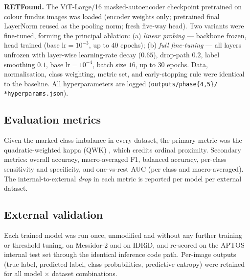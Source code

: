 \documentclass[journal]{IEEEtran}
\renewcommand{\_}{\origunderscore\allowbreak}
\begin{document}
\textbf{RETFound.} The ViT-Large/16 masked-autoencoder checkpoint pretrained on
colour fundus images \cite{zhou2023retfound} was loaded (encoder weights only;
pretrained final LayerNorm reused as the pooling norm; fresh five-way head). Two
variants were fine-tuned, forming the principal ablation: (a) \emph{linear
probing} --- backbone frozen, head trained (base $\text{lr}=10^{-3}$, up to $40$
epochs); (b) \emph{full fine-tuning} --- all layers unfrozen with layer-wise
learning-rate decay ($0.65$), drop-path $0.2$, label smoothing $0.1$, base
$\text{lr}=10^{-4}$, batch size $16$, up to $30$ epochs. Data, normalisation,
class weighting, metric set, and early-stopping rule were identical to the
baseline. All hyperparameters are logged
(\texttt{outputs/\allowbreak{}phase\{4,5\}\_*/\allowbreak{}\,*\_hyperparams.json}).

\subsection{Evaluation metrics}
\label{sec:methods-metrics}

Given the marked class imbalance in every dataset, the primary metric was the
quadratic-weighted kappa (QWK) \cite{cohen1968kappa}, which credits ordinal
proximity. Secondary metrics: overall accuracy, macro-averaged F1, balanced
accuracy, per-class sensitivity and specificity, and one-vs-rest AUC (per class
and macro-averaged). The internal-to-external \emph{drop} in each metric is
reported per model per external dataset.

\subsection{External validation}
\label{sec:methods-ext}

Each trained model was run once, unmodified and without any further training or
threshold tuning, on Messidor-2 and on IDRiD, and re-scored on the APTOS internal
test set through the identical inference code path. Per-image outputs (true label,
predicted label, class probabilities, predictive entropy) were retained for all
model $\times$ dataset combinations.
\end{document}
